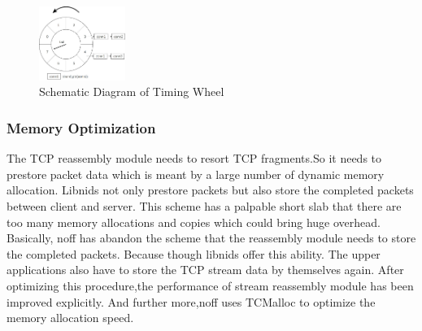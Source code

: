 \documentclass[conference]{IEEEtran}
\begin{document}
\begin{figure}[htbp]
  \centering
  \includegraphics[width=0.25\textwidth]{./picture/Figure16.jpg}
  \caption{Schematic Diagram of Timing Wheel}
  \label{fig:5}
\end{figure}
\subsubsection{Memory Optimization}
The TCP reassembly module needs to resort TCP fragments.So it needs to prestore packet data which is meant by a large number of dynamic memory allocation. Libnids not only prestore packets but also store the completed packets between client and server. This scheme has a palpable short slab that there are too many memory allocations and copies which could bring huge overhead.
\newline\indent Basically, noff has abandon the scheme that the reassembly module needs to store the completed packets. Because though libnids offer this ability. The upper applications also have to store the TCP stream data by themselves again. After optimizing this procedure,the performance of stream reassembly module has been improved explicitly.
And further more,noff uses TCMalloc to optimize the memory allocation speed.
\end{document}
